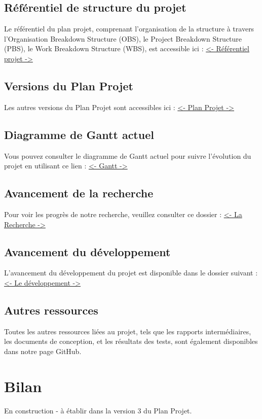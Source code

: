 \documentclass[11pt]{rapport_class}
\begin{document}
\section{Référentiel de structure du projet}
\label{referentiel projet}
\qquad Le référentiel du plan projet, comprenant l'organisation de la structure à travers l'Organisation Breakdown Structure (OBS), le Project Breakdown Structure (PBS), le Work Breakdown Structure (WBS), est accessible ici :
\href{https://github.com/fghjklm/Projet_M1_CheckThat-/tree/main/referentiel_projet}{<- Référentiel projet ->}

\section{Versions du Plan Projet}
\qquad Les autres versions du Plan Projet sont accessibles ici :
\href{https://github.com/fghjklm/Projet_M1_CheckThat-/tree/main/plan_projet}{<- Plan Projet ->}

\section{Diagramme de Gantt actuel}
\qquad Vous pouvez consulter le diagramme de Gantt actuel pour suivre l'évolution du projet en utilisant ce lien :
\href{https://github.com/fghjklm/Projet_M1_CheckThat-/tree/main/gantt}{<- Gantt ->}

\section{Avancement de la recherche}
\qquad Pour voir les progrès de notre recherche, veuillez consulter ce dossier :
\href{https://github.com/fghjklm/Projet_M1_CheckThat-/tree/main/articles}{<- La Recherche ->}

\section{Avancement du développement}
\qquad L'avancement du développement du projet est disponible dans le dossier suivant :
\href{https://github.com/fghjklm/Projet_M1_CheckThat-/tree/main/code}{<- Le développement ->}

\section{Autres ressources}
\qquad Toutes les autres ressources liées au projet, tels que les rapports intermédiaires, les documents de conception, et les résultats des tests, sont également disponibles dans notre page GitHub.


\chapter{Bilan}
\centerline{En construction - à établir dans la version 3 du Plan Projet.}
\end{document}
